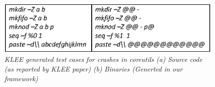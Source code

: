 \begin{figure}[t]
{
\centering
\includegraphics[width=0.5\linewidth]{figures/EPS/resultssymExecution-testCase.eps}
\vspace{-3ex}
\caption{\textit{KLEE generated test cases for crashes in coreutils (a) Source code (as reported by KLEE paper) (b) Binaries (Generted in our framework)}}
\label{fig:result-symExec-testCases}
}
\vspace{-4ex}
\end{figure}
